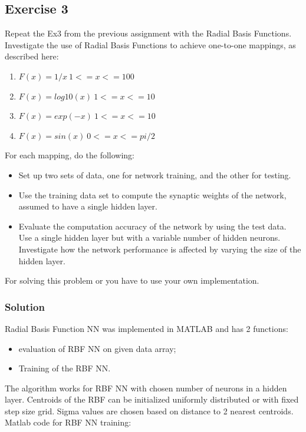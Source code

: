 \documentclass[a4paper, 12pt]{article}
\begin{document}
\subsection{Exercise 3}
Repeat the Ex3 from the previous assignment with the Radial Basis Functions. Investigate the use of Radial Basis Functions to achieve one-to-one mappings, as described here:
\begin{enumerate}
\item $F(x) = 1/x ~1<=x<=100$

\item $F(x) = log10(x) ~1<=x<=10$

\item $F(x) = exp(-x) ~1<=x<=10$

\item $F(x) = sin(x) ~0<=x<=pi/2$
\end{enumerate}
For each mapping, do the following:
\begin{itemize}
\item Set up two sets of data, one for network training, and the other for testing.

\item Use the training data set to compute the synaptic weights of the network, assumed to have a single hidden layer.

\item Evaluate the computation accuracy of the network by using the test data. Use a single hidden layer but with a variable number of hidden neurons. Investigate how the network performance is affected by varying the size of the hidden layer.
\end{itemize}
For solving this problem or you have to use your own implementation.

\subsubsection{Solution}

Radial Basis Function NN was implemented in MATLAB and has 2 functions:
\begin{itemize}
\item evaluation of RBF NN on given data array;

\item Training of the RBF NN.
\end{itemize}

The algorithm works for RBF NN with chosen number of neurons in a hidden layer. Centroids of the RBF can be initialized uniformly distributed or with fixed step size grid. Sigma values are chosen based on distance to 2 nearest centroids.
\medskip
Matlab code for RBF NN training:
\end{document}
